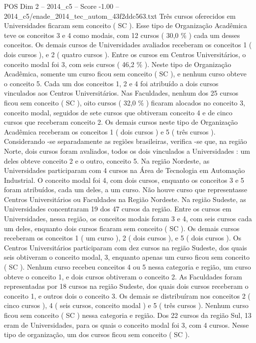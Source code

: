 \begin{textsample}{POS Dim 2 – 2014\_c5 – Score -1.00 – 2014\_c5/enade\_2014\_tec\_autom\_43f2ddc563.txt}
Três cursos oferecidos em Universidades ficaram sem conceito ( SC ).
Esse tipo de Organização Acadêmica teve os conceitos 3 e 4 como modais, com 12 cursos ( 30,0 \% ) cada um desses conceitos.
Os demais cursos de Universidades avaliados receberam os conceitos 1 ( dois cursos ), e 2 ( quatro cursos ).
Entre os cursos em Centros Universitários, o conceito modal foi 3, com seis cursos ( 46,2 \% ).
Neste tipo de Organização Acadêmica, somente um curso ficou sem conceito ( SC ), e nenhum curso obteve o conceito 5.
Cada um dos conceitos 1, 2 e 4 foi atribuído a dois cursos vinculados aos Centros Universitários.
Nas Faculdades, nenhum dos 25 cursos ficou sem conceito ( SC ), oito cursos ( 32,0 \% ) ficaram alocados no conceito 3, conceito modal, seguidos de sete cursos que obtiveram conceito 4 e de cinco cursos que receberam conceito 2.
Os demais cursos neste tipo de Organização Acadêmica receberam os conceitos 1 ( dois cursos ) e 5 ( três cursos ).
Considerando -se separadamente as regiões brasileiras, verifica -se que, na região Norte, dois cursos foram avaliados, todos os dois vinculados a Universidades : um deles obteve conceito 2 e o outro, conceito 5.
Na região Nordeste, as Universidades participaram com 4 cursos na Área de Tecnologia em Automação Industrial.
O conceito modal foi 4, com dois cursos, enquanto os conceitos 3 e 5 foram atribuídos, cada um deles, a um curso.
Não houve curso que representasse Centros Universitários ou Faculdades na Região Nordeste.
Na região Sudeste, as Universidades concentraram 19 dos 47 cursos da região.
Entre os cursos em Universidades, nessa região, os conceitos modais foram 3 e 4, com seis cursos cada um deles, enquanto dois cursos ficaram sem conceito ( SC ).
Os demais cursos receberam os conceitos 1 ( um curso ), 2 ( dois cursos ), e 5 ( dois cursos ).
Os Centros Universitários participaram com dez cursos na região Sudeste, dos quais seis obtiveram o conceito modal, 3, enquanto apenas um curso ficou sem conceito ( SC ).
Nenhum curso recebeu conceitos 4 ou 5 nessa categoria e região, um curso obteve o conceito 1, e dois cursos obtiveram o conceito 2.
As Faculdades foram representadas por 18 cursos na região Sudeste, dos quais dois cursos receberam o conceito 1, e outros dois o conceito 3.
Os demais se distribuíram nos conceitos 2 ( cinco cursos ), 4 ( seis cursos, conceito modal ) e 5 ( três cursos ).
Nenhum curso ficou sem conceito ( SC ) nessa categoria e região.
Dos 22 cursos da região Sul, 13 eram de Universidades, para os quais o conceito modal foi 3, com 4 cursos.
Nesse tipo de organização, um dos cursos ficou sem conceito ( SC ).

\end{textsample}
